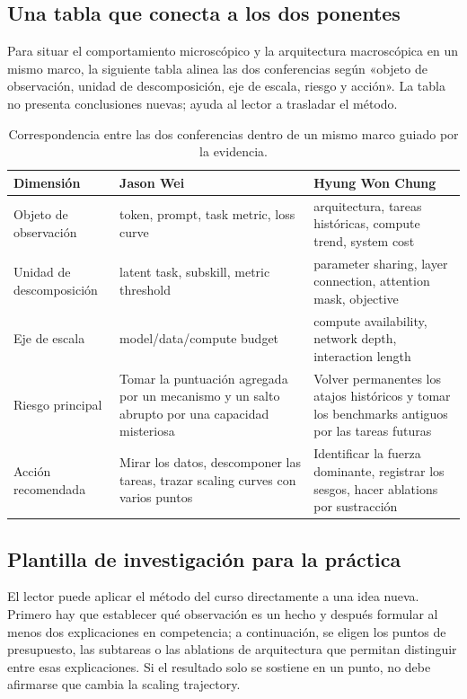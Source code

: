\documentclass[a4paper]{article}
\begin{document}
\subsection{Una tabla que conecta a los dos ponentes}

Para situar el comportamiento microscópico y la arquitectura macroscópica en un mismo marco, la siguiente tabla alinea las dos conferencias según «objeto de observación, unidad de descomposición, eje de escala, riesgo y acción». La tabla no presenta conclusiones nuevas; ayuda al lector a trasladar el método.

\begin{table}[H]
\centering
\begin{tabularx}{\textwidth}{L{0.18\textwidth} X X}
\toprule
Dimensión & Jason Wei & Hyung Won Chung \\
\midrule
Objeto de observación & token, prompt, task metric, loss curve & arquitectura, tareas históricas, compute trend, system cost \\
Unidad de descomposición & latent task, subskill, metric threshold & parameter sharing, layer connection, attention mask, objective \\
Eje de escala & model/data/compute budget & compute availability, network depth, interaction length \\
Riesgo principal & Tomar la puntuación agregada por un mecanismo y un salto abrupto por una capacidad misteriosa & Volver permanentes los atajos históricos y tomar los benchmarks antiguos por las tareas futuras \\
Acción recomendada & Mirar los datos, descomponer las tareas, trazar scaling curves con varios puntos & Identificar la fuerza dominante, registrar los sesgos, hacer ablations por sustracción \\
\bottomrule
\end{tabularx}
\caption{Correspondencia entre las dos conferencias dentro de un mismo marco guiado por la evidencia.}
\end{table}

\subsection{Plantilla de investigación para la práctica}

El lector puede aplicar el método del curso directamente a una idea nueva. Primero hay que establecer qué observación es un hecho y después formular al menos dos explicaciones en competencia; a continuación, se eligen los puntos de presupuesto, las subtareas o las ablations de arquitectura que permitan distinguir entre esas explicaciones. Si el resultado solo se sostiene en un punto, no debe afirmarse que cambia la scaling trajectory.
\end{document}
